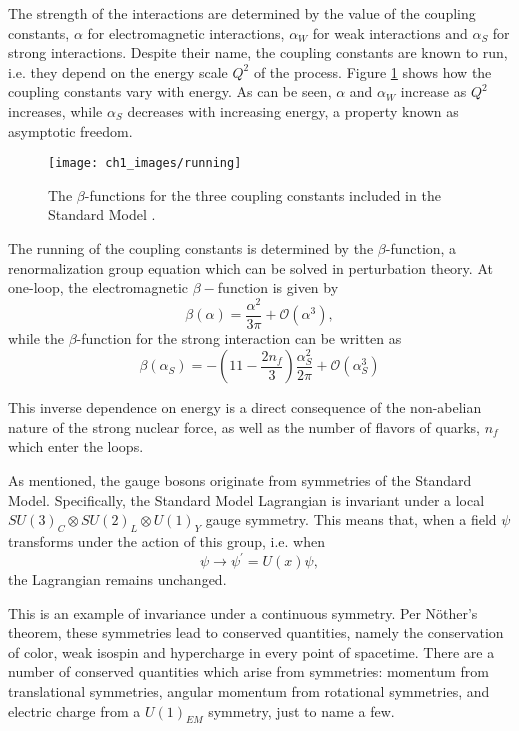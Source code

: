 \documentclass[10pt,a4paper]{book}
\begin{document}
The strength of the interactions are determined by the value of the coupling constants, $\alpha$ for electromagnetic interactions, $\alpha_W$ for weak interactions and $\alpha_S$ for strong interactions. Despite their name, the coupling constants are known to run, i.e. they depend on the energy scale $Q^2$ of the process. Figure \ref{running coupling constants} shows how the coupling constants vary with energy. As can be seen, $\alpha$ and $\alpha_W$ increase as $Q^2$ increases, while $\alpha_S$ decreases with increasing energy, a property known as asymptotic freedom. 

\begin{figure}
\centering
\texttt{[image: ch1\_images/running]}
\caption{The $\beta$-functions for the three coupling constants included in the Standard Model \cite{wiki:xxx}.}
\label{running coupling constants}
\end{figure}

The running of the coupling constants is determined by the $\beta$-function, a renormalization group equation which can be solved in perturbation theory. At one-loop, the electromagnetic $\beta-$function is given by \cite{pinkbook}
\begin{equation}
\beta(\alpha) = \frac{\alpha^2}{3\pi} + \mathcal{O}(\alpha^3),
\end{equation}
while the $\beta$-function for the strong interaction can be written as
\begin{equation}
\beta(\alpha_S) = -\left(11 - \frac{2n_f}{3} \right)\frac{\alpha_S^2}{2\pi} + \mathcal{O}(\alpha_S^3)
\end{equation}

This inverse dependence on energy is a direct consequence of the non-abelian nature of the strong nuclear force, as well as the number of flavors of quarks, $n_f$ which enter the loops.  

As mentioned, the gauge bosons originate from symmetries of the Standard Model. Specifically, the Standard Model Lagrangian is invariant under a local $SU(3)_C \otimes SU(2)_L \otimes U(1)_Y$ gauge symmetry. This means that, when a field $\psi$ transforms under the action of this group, i.e. when
\begin{equation}
\psi \rightarrow \psi^\prime = U(x)\psi,
\end{equation}
the Lagrangian remains unchanged. 

This is an example of invariance under a continuous symmetry. Per N\"{o}ther's theorem, these symmetries lead to conserved quantities, namely the conservation of color, weak isospin and hypercharge in every point of spacetime. There are a number of conserved quantities which arise from symmetries: momentum from translational symmetries, angular momentum from rotational symmetries, and electric charge from a $U(1)_{EM}$ symmetry, just to name a few.
\end{document}
